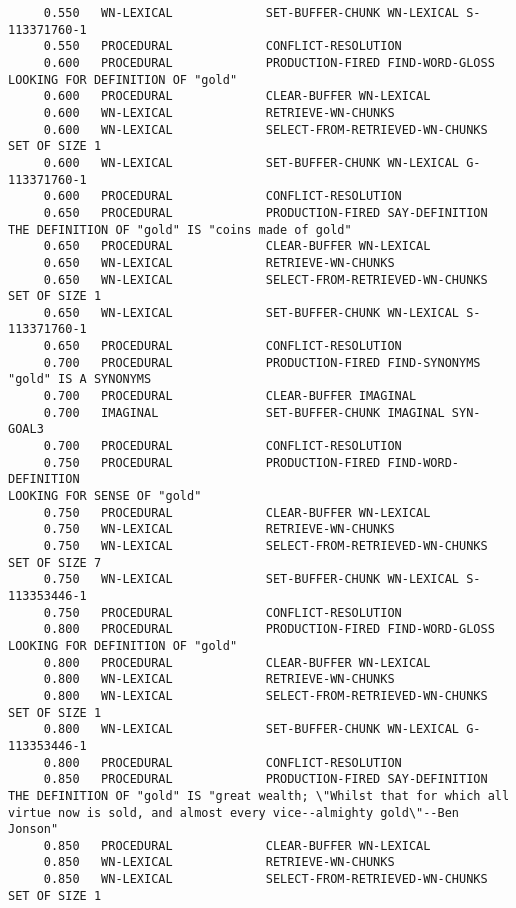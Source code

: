 \begin{verbatim}
     0.550   WN-LEXICAL             SET-BUFFER-CHUNK WN-LEXICAL S-113371760-1 
     0.550   PROCEDURAL             CONFLICT-RESOLUTION 
     0.600   PROCEDURAL             PRODUCTION-FIRED FIND-WORD-GLOSS 
LOOKING FOR DEFINITION OF "gold" 
     0.600   PROCEDURAL             CLEAR-BUFFER WN-LEXICAL 
     0.600   WN-LEXICAL             RETRIEVE-WN-CHUNKS 
     0.600   WN-LEXICAL             SELECT-FROM-RETRIEVED-WN-CHUNKS SET OF SIZE 1 
     0.600   WN-LEXICAL             SET-BUFFER-CHUNK WN-LEXICAL G-113371760-1 
     0.600   PROCEDURAL             CONFLICT-RESOLUTION 
     0.650   PROCEDURAL             PRODUCTION-FIRED SAY-DEFINITION 
THE DEFINITION OF "gold" IS "coins made of gold" 
     0.650   PROCEDURAL             CLEAR-BUFFER WN-LEXICAL 
     0.650   WN-LEXICAL             RETRIEVE-WN-CHUNKS 
     0.650   WN-LEXICAL             SELECT-FROM-RETRIEVED-WN-CHUNKS SET OF SIZE 1 
     0.650   WN-LEXICAL             SET-BUFFER-CHUNK WN-LEXICAL S-113371760-1 
     0.650   PROCEDURAL             CONFLICT-RESOLUTION 
     0.700   PROCEDURAL             PRODUCTION-FIRED FIND-SYNONYMS 
"gold" IS A SYNONYMS 
     0.700   PROCEDURAL             CLEAR-BUFFER IMAGINAL 
     0.700   IMAGINAL               SET-BUFFER-CHUNK IMAGINAL SYN-GOAL3 
     0.700   PROCEDURAL             CONFLICT-RESOLUTION 
     0.750   PROCEDURAL             PRODUCTION-FIRED FIND-WORD-DEFINITION 
LOOKING FOR SENSE OF "gold" 
     0.750   PROCEDURAL             CLEAR-BUFFER WN-LEXICAL 
     0.750   WN-LEXICAL             RETRIEVE-WN-CHUNKS 
     0.750   WN-LEXICAL             SELECT-FROM-RETRIEVED-WN-CHUNKS SET OF SIZE 7 
     0.750   WN-LEXICAL             SET-BUFFER-CHUNK WN-LEXICAL S-113353446-1 
     0.750   PROCEDURAL             CONFLICT-RESOLUTION 
     0.800   PROCEDURAL             PRODUCTION-FIRED FIND-WORD-GLOSS 
LOOKING FOR DEFINITION OF "gold" 
     0.800   PROCEDURAL             CLEAR-BUFFER WN-LEXICAL 
     0.800   WN-LEXICAL             RETRIEVE-WN-CHUNKS 
     0.800   WN-LEXICAL             SELECT-FROM-RETRIEVED-WN-CHUNKS SET OF SIZE 1 
     0.800   WN-LEXICAL             SET-BUFFER-CHUNK WN-LEXICAL G-113353446-1 
     0.800   PROCEDURAL             CONFLICT-RESOLUTION 
     0.850   PROCEDURAL             PRODUCTION-FIRED SAY-DEFINITION 
THE DEFINITION OF "gold" IS "great wealth; \"Whilst that for which all virtue now is sold, and almost every vice--almighty gold\"--Ben Jonson" 
     0.850   PROCEDURAL             CLEAR-BUFFER WN-LEXICAL 
     0.850   WN-LEXICAL             RETRIEVE-WN-CHUNKS 
     0.850   WN-LEXICAL             SELECT-FROM-RETRIEVED-WN-CHUNKS SET OF SIZE 1 

\end{verbatim}
